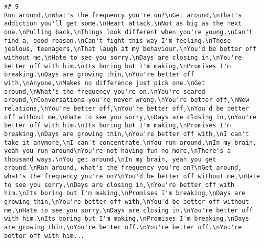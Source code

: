 \documentclass[]{article}
\begin{document}
\begin{verbatim}
## 9                                                                                                                                                                                                                                                                                                                                                                                                                                                                                                                                                                                                                                                                                                                                                                                                                                                                                                                                                                                                                                                                                                                                                                                                                                                                                                                                                     Run around,\nWhat's the frequency you're on?\nGet around,\nThat's addiction you'll get some.\nHeart attack,\nNot as big as the next one.\nPulling back,\nThings look different when you're young.\nCan't find a, good reason.\nCan't fight this way I'm feeling.\nThese jealous, teenagers,\nThat laugh at my behaviour.\nYou'd be better off without me,\nHate to see you sorry,\nDays are closing in,\nYou're better off with him.\nIts boring but I'm making,\nPromises I'm breaking,\nDays are growing thin,\nYou're better off with,\nAnyone,\nMakes no difference just pick one.\nGet around,\nWhat's the frequency you're on.\nYou're scared around,\nConversations you're never wrong.\nYou're better off,\nNew relations,\nYou're better off,\nYou're better off,\nYou'd be better off without me,\nHate to see you sorry,\nDays are closing in,\nYou're better off with him.\nIts boring but I'm making,\nPromises I'm breaking,\nDays are growing thin,\nYou're better off with,\nI can't take it anymore,\nI can't concentrate.\nYou run around,\nIn my brain, yeah you run around\nYou're not having fun no more,\nThere's a thousand ways.\nYou get around,\nIn my brain, yeah you get around.\nRun around, what's the frequency you're on?\nGet around, what's the frequency you're on?\nYou'd be better off without me,\nHate to see you sorry,\nDays are closing in,\nYou're better off with him.\nIts boring but I'm making,\nPromises I'm breaking,\nDays are growing thin,\nYou're better off with,\nYou'd be better off without me,\nHate to see you sorry,\nDays are closing in,\nYou're better off with him.\nIts boring but I'm making,\nPromises I'm breaking,\nDays are growing thin,\nYou're better off.\nYou're better off.\nYou're better off with him...

\end{verbatim}
\end{document}
